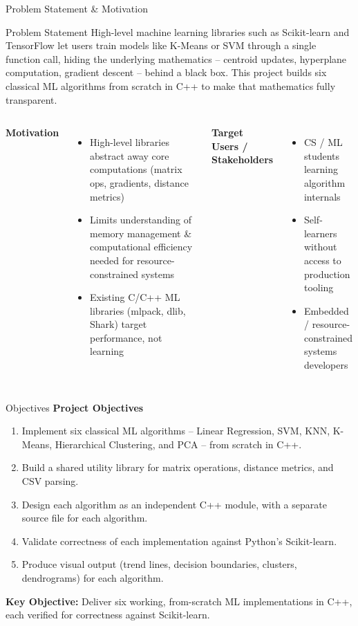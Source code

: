 \documentclass[aspectratio=169,11pt]{beamer}
\begin{document}
\begin{frame}{Problem Statement \& Motivation}
\begin{block}{Problem Statement}
High-level machine learning libraries such as Scikit-learn and TensorFlow let users train models like K-Means or SVM through a single function call, hiding the underlying mathematics -- centroid updates, hyperplane computation, gradient descent -- behind a black box. This project builds six classical ML algorithms from scratch in C++ to make that mathematics fully transparent.
\end{block}
\vspace{2mm}
\begin{columns}[T,totalwidth=\textwidth]
\textbf{\color{GEUBlue}Motivation}
\begin{itemize}\itemsep2pt
\item High-level libraries abstract away core computations (matrix ops, gradients, distance metrics)
\item Limits understanding of memory management \& computational efficiency needed for resource-constrained systems
\item Existing C/C++ ML libraries (mlpack, dlib, Shark) target performance, not learning
\end{itemize}
\textbf{\color{GEUBlue}Target Users / Stakeholders}
\begin{itemize}\itemsep2pt
\item CS / ML students learning algorithm internals
\item Self-learners without access to production tooling
\item Embedded / resource-constrained systems developers
\end{itemize}
\end{columns}
\end{frame}

\begin{frame}{Objectives}
\textbf{\color{GEUBlue}Project Objectives}
\vspace{2mm}
\begin{enumerate}\itemsep5pt
\item Implement six classical ML algorithms -- Linear Regression, SVM, KNN, K-Means, Hierarchical Clustering, and PCA -- from scratch in C++.
\item Build a shared utility library for matrix operations, distance metrics, and CSV parsing.
\item Design each algorithm as an independent C++ module, with a separate source file for each algorithm.
\item Validate correctness of each implementation against Python's Scikit-learn.
\item Produce visual output (trend lines, decision boundaries, clusters, dendrograms) for each algorithm.
\end{enumerate}
\vfill
\begin{center}
\colorbox{GEULightBlue}{\parbox{.85\textwidth}{\centering
\textbf{Key Objective:} Deliver six working, from-scratch ML implementations in C++, each verified for correctness against Scikit-learn.}}
\end{center}
\end{frame}
\end{document}
